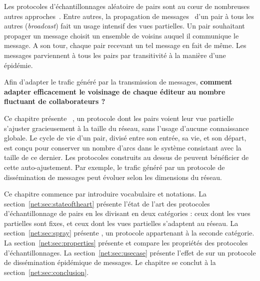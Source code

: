 Les protocoles d'échantillonnages aléatoire de pairs sont au cœur de nombreuses
autres approches~\cite{folz2016cyclades, jelasity2009tman,
  krasikova2016distributed, voulgaris2013vicinity}. Entre autres, la propagation
de messages~\cite{birman1999bimodal, kermarrec2003probabilistic} d'un pair à
tous les autres (\emph{broadcast}) fait un usage intensif des vues
partielles. Un pair souhaitant propager un message choisit un ensemble de
voisins auquel il communique le message. A son tour, chaque pair recevant un tel
message en fait de même. Les messages parviennent à tous les pairs par
transitivité à la manière d'une épidémie.

Afin d'adapter le trafic généré par la transmission de messages, \textbf{comment
  adapter efficacement le voisinage de chaque éditeur au nombre fluctuant de
  collaborateurs ?}

Ce chapitre présente \SPRAY~\cite{nedelec2015spray}, un protocole dont les pairs
voient leur vue partielle s'ajuster gracieusement à la taille du réseau, sans
l'usage d'aucune connaissance globale. Le cycle de vie d'un pair, divisé entre
son entrée, sa vie, et son départ, est conçu pour conserver un nombre d'arcs
dans le système consistant avec la taille de ce dernier. Les protocoles
construits au dessus de \SPRAY peuvent bénéficier de cette auto-ajustement. Par
exemple, le trafic généré par un protocole de dissémination de messages peut
évoluer selon les dimensions du réseau.

Ce chapitre commence par introduire vocabulaire et notations. La
section~\ref{net:sec:stateoftheart} présente l'état de l'art des protocoles
d'échantillonnage de pairs en les divisant en deux catégories : ceux dont les
vues partielles sont fixes, et ceux dont les vues partielles s'adaptent au
réseau. La section~\ref{net:sec:spray} présente \SPRAY, un protocole appartenant
à la seconde catégorie. La section~\ref{net:sec:properties} présente et compare
les propriétés des protocoles d'échantillonnages. La
section~\ref{net:sec:usecase} présente l'effet de \SPRAY sur un protocole de
dissémination épidémique de messages. Le chapitre se conclut à la
section~\ref{net:sec:conclusion}.

